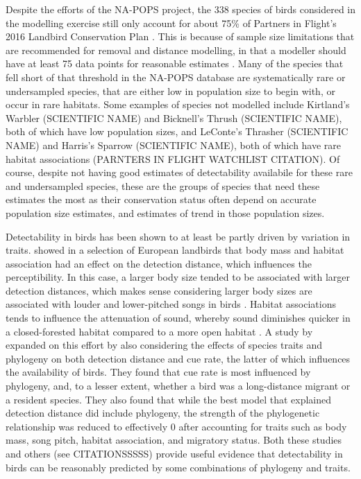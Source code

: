 \documentclass[12pt]{article}
\begin{document}
\par Despite the efforts of the NA-POPS project, the 338 species of birds considered in the modelling exercise still only account for about 75\% of Partners in Flight's 2016 Landbird Conservation Plan \citep{edwards_point_2023, rosenberg_partners_2016}.
This is because of sample size limitations that are recommended for removal and distance modelling, in that a modeller should have at least 75 data points for reasonable estimates \citep{buckland_introduction_2001}. 
Many of the species that fell short of that threshold in the NA-POPS database are systematically rare or undersampled species, that are either low in population size to begin with, or occur in rare habitats.
Some examples of species not modelled include Kirtland's Warbler (SCIENTIFIC NAME) and Bicknell's Thrush (SCIENTIFIC NAME), both of which have low population sizes, and LeConte's Thrasher (SCIENTIFIC NAME) and Harris's Sparrow (SCIENTIFIC NAME), both of which have rare habitat associations  (PARNTERS IN FLIGHT WATCHLIST CITATION).
Of course, despite not having good estimates of detectability availabile for these rare and undersampled species, these are the groups of species that need these estimates the most as their conservation status often depend on accurate population size estimates, and estimates of trend in those population sizes.

\par Detectability in birds has been shown to at least be partly driven by variation in traits. \cite{johnston_species_2014} showed in a selection of European landbirds that body mass and habitat association had an effect on the detection distance, which influences the perceptibility.
In this case, a larger body size tended to be associated with larger detection distances, which makes sense considering larger body sizes are associated with louder and lower-pitched songs in birds \citep{bowman_adaptive_1979, fletcher_acoustics_1999, ryan_role_1985}.
Habitat associations tends to influence the attenuation of sound, whereby sound diminishes quicker in a closed-forested habitat compared to a more open habitat \citep{waide_tropical_1988, yip_sound_2017}.
A study by \cite{solymos_phylogeny_2018} expanded on this effort by also considering the effects of species traits and phylogeny on both detection distance and cue rate, the latter of which influences the availability of birds.
They found that cue rate is most influenced by phylogeny, and, to a lesser extent, whether a bird was a long-distance migrant or a resident species.
They also found that while the best model that explained detection distance did include phylogeny, the strength of the phylogenetic relationship was reduced to effectively 0 after accounting for traits such as body mass, song pitch, habitat association, and migratory status. 
Both these studies and others (see CITATIONSSSSS) provide useful evidence that detectability in birds can be reasonably predicted by some combinations of phylogeny and traits.
\end{document}
